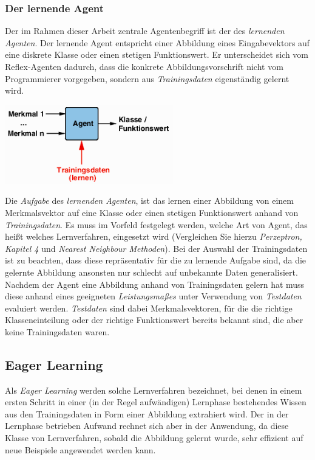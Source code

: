 \documentclass[fontsize=11pt]{scrartcl}
\newenvironment{Figure}
  {\par\medskip\noindent\minipage{\linewidth}}
  {\endminipage\par\medskip}
\newcommand*{\quelle}{%
  \footnotesize Quelle: 
}
\begin{document}
            \subsubsection{Der lernende Agent}
                Der im Rahmen dieser Arbeit zentrale Agentenbegriff ist der des \emph{lernenden Agenten}. Der lernende Agent entspricht einer Abbildung eines Eingabevektors auf eine diskrete Klasse oder einen stetigen Funktionswert. Er unterscheidet sich vom Reflex-Agenten dadurch, dass die konkrete Abbildungsvorschrift nicht vom Programmierer vorgegeben, sondern aus \emph{Trainingsdaten} eigenständig gelernt wird.
                \begin{Figure}
                   \centering
                   \includegraphics[scale=1]{lernenderagent.png}
                   \raggedleft\footnotesize\cite[S.194, Abb. 8.4(rechts)]{ertel2016}
                \end{Figure}
                Die \emph{Aufgabe} des \emph{lernenden Agenten}, ist das lernen einer Abbildung von einem Merkmalsvektor auf eine Klasse oder einen stetigen Funktionswert anhand von \emph{Trainingsdaten}. Es muss im Vorfeld festgelegt werden, welche Art von Agent, das heißt welches Lernverfahren, eingesetzt wird (Vergleichen Sie hierzu \emph{Perzeptron, Kapitel 4} und \emph{Nearest Neighbour Methoden}).
                Bei der Auswahl der Trainingsdaten ist zu beachten, dass diese repräsentativ für die zu lernende Aufgabe sind, da die gelernte Abbildung ansonsten nur schlecht auf unbekannte Daten generalisiert.\\
                Nachdem der Agent eine Abbildung anhand von Trainingsdaten gelern hat muss diese anhand eines geeigneten \emph{Leistungsmaßes} unter Verwendung von \emph{Testdaten} evaluiert werden. \emph{Testdaten} sind dabei Merkmalsvektoren, für die  die richtige Klasseneinteilung oder der richtige Funktionswert bereits bekannt sind, die aber keine Trainingsdaten waren.

            \subsection{Eager Learning}
                Als \emph{Eager Learning} werden solche Lernverfahren bezeichnet, bei denen in einem ersten Schritt in einer (in der Regel aufwändigen) Lernphase bestehendes Wissen aus den Trainingsdaten in Form einer Abbildung extrahiert wird.
                Der in der Lernphase betrieben Aufwand rechnet sich aber in der Anwendung, da diese Klasse von Lernverfahren, sobald die Abbildung gelernt wurde, sehr effizient auf neue Beispiele angewendet werden kann.\cite{ertel2016} 
\end{document}
